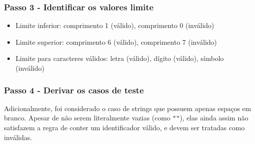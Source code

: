 \documentclass[
  letterpaper,
  DIV=11,
  numbers=noendperiod]{scrartcl}
\providecommand{\tightlist}{%
  \setlength{\itemsep}{0pt}\setlength{\parskip}{0pt}}
\begin{document}
\subsubsection{Passo 3 - Identificar os valores
limite}\label{passo-3---identificar-os-valores-limite}

\begin{itemize}
\tightlist
\item
  Limite inferior: comprimento 1 (válido), comprimento 0 (inválido)
\item
  Limite superior: comprimento 6 (válido), comprimento 7 (inválido)
\item
  Limite para caracteres válidos: letra (válido), dígito (válido),
  símbolo (inválido)
\end{itemize}

\subsubsection{Passo 4 - Derivar os casos de
teste}\label{passo-4---derivar-os-casos-de-teste}

Adicionalmente, foi considerado o caso de strings que possuem apenas
espaços em branco. Apesar de não serem literalmente vazias (como
\texttt{""}), elas ainda assim não satisfazem a regra de conter um
identificador válido, e devem ser tratadas como inválidas.
\end{document}
